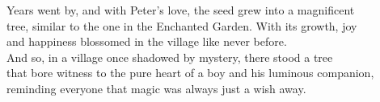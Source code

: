 \documentclass[12pt, a4paper, titlepage]{article}
\begin{document}
Years went by, and with Peter's love, the seed grew into a magnificent\\
tree, similar to the one in the Enchanted Garden. With its growth, joy\\
and happiness blossomed in the village like never before.\\


And so, in a village once shadowed by mystery, there stood a tree\\
that bore witness to the pure heart of a boy and his luminous companion,\\
reminding everyone that magic was always just a wish away.\\
\end{document}
